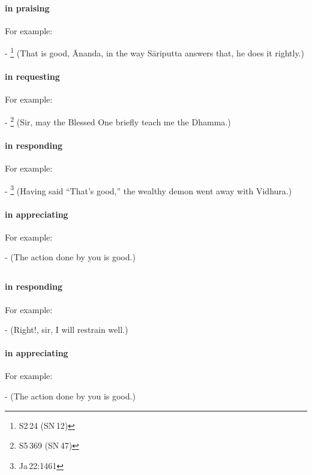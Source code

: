 \paragraph*{ in praising} For example:\par
- \footnote{S2\,24 (SN\,12)} (That is good, \=Ananda, in the way S\=ariputta answers that, he does it rightly.) \par
\paragraph*{ in requesting} For example:\par
- \footnote{S5\,369 (SN\,47)} (Sir, may the Blessed One briefly teach me the Dhamma.) \par
\paragraph*{ in responding} For example:\par
- \footnote{Ja\,22:1461} (Having said ``That's good,'' the wealthy demon went away with Vidhura.) \par
\paragraph*{ in appreciating} For example:\par
-  (The action done by you is good.) \par

\subsection*{}\label{nip:sudtdthu}
\paragraph*{ in responding} For example:\par
-  (Right!, sir, I will restrain well.) \par
\paragraph*{ in appreciating} For example:\par
-  (The action done by you is good.) \par


